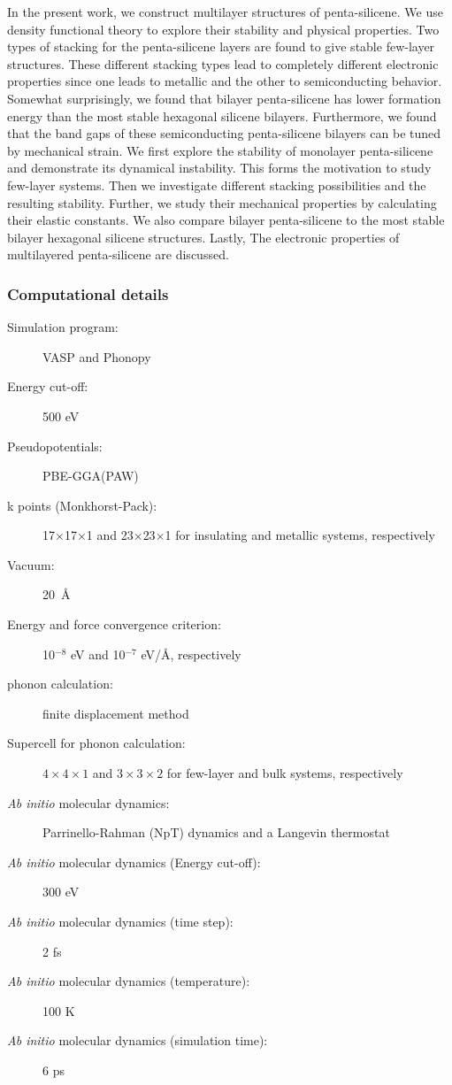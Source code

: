 In the present work, we construct multilayer structures of penta-silicene. We use density functional theory to explore their stability and physical properties. Two types of stacking for the penta-silicene layers are found to give stable few-layer structures. These different stacking types lead to completely different electronic properties since one leads to metallic and the other to semiconducting behavior. Somewhat surprisingly, we found that bilayer penta-silicene has lower formation energy than the most stable hexagonal silicene bilayers. Furthermore, we found that the band gaps of these semiconducting penta-silicene bilayers can be tuned by mechanical strain. We first explore the stability of monolayer penta-silicene and demonstrate its dynamical instability. This forms the motivation to study few-layer systems. Then we investigate different stacking possibilities and the resulting stability. Further, we study their mechanical properties by calculating their elastic constants.  We also compare bilayer penta-silicene to the most stable bilayer hexagonal silicene structures. Lastly, The electronic properties of multilayered penta-silicene are discussed.

\subsubsection{Computational details}

\begin{footnotesize}
\begin{description}
\item[Simulation program:] VASP and Phonopy
\item[Energy cut-off:] 500 eV
\item[Pseudopotentials:] PBE-GGA(PAW)
\item[k points (Monkhorst-Pack):] 17$\times$17$\times$1 and 23$\times$23$\times$1 for insulating and metallic systems, respectively 
\item[Vacuum:] 20~\AA
\item[Energy and force convergence criterion:] 10$^{-8}$ eV and 10$^{-7}$ eV/\AA, respectively
\item[phonon calculation:] finite displacement method
\item[Supercell for phonon calculation:] $4\times4\times1$ and $3\times3\times2$ for few-layer and bulk systems, respectively
\item[\textit{Ab initio} molecular dynamics:] Parrinello-Rahman (NpT) dynamics \cite{vasp_npt1,vasp_npt2} and a Langevin thermostat \cite{vasp_Lgv}
\item[\textit{Ab initio} molecular dynamics (Energy cut-off):] 300 eV
\item[\textit{Ab initio} molecular dynamics (time step):] 2 fs
\item[\textit{Ab initio} molecular dynamics (temperature):] 100 K
\item[\textit{Ab initio} molecular dynamics (simulation time):] 6 ps
\end{description}
\end{footnotesize}

